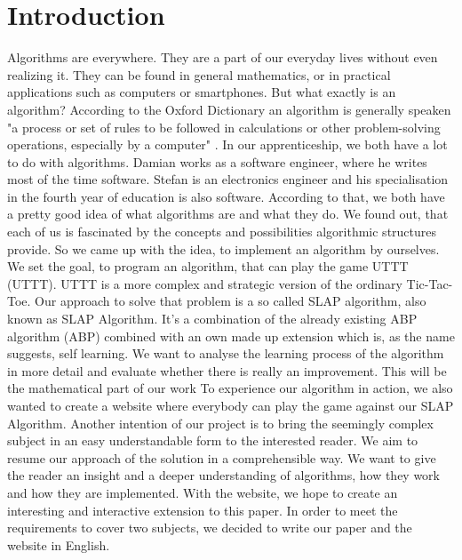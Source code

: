 \section{Introduction}
Algorithms are everywhere. They are a part of our everyday lives without even realizing it. They can be found in general mathematics, or in practical applications such as  computers or smartphones. But what exactly is an algorithm? According to the Oxford Dictionary an algorithm is generally speaken "a process or set of rules to be followed in calculations or other problem-solving operations, especially by a computer" \cite{web:oxforddictionaries2018}.
In our apprenticeship, we both have a lot to do with algorithms. Damian works as a software engineer, where he writes most of the time software. Stefan is an electronics engineer and his specialisation in the fourth year of education is also software. According to that, we both have a pretty good idea of what algorithms are and what they do. We found out, that each of us is fascinated by the concepts and possibilities algorithmic structures provide. So we came up with the idea, to implement an algorithm by ourselves. \\

We set the goal, to program an algorithm, that can play the game \acl{UTTT} (\ac{UTTT}). \ac{UTTT} is a more complex and strategic version of the ordinary Tic-Tac-Toe. 
Our approach to solve that problem is a so called \acl {SLAP}  algorithm, also known as \ac{SLAP} Algorithm. It's a combination of the already existing \acl{ABP} algorithm (\ac{ABP}) combined with an own made up extension which is, as the name suggests, self learning. We want to analyse the learning process of the algorithm in more detail and evaluate whether there is really an improvement. This will be the mathematical part of our work
To experience our algorithm in action, we also wanted to create a website where everybody can play the game against our \ac{SLAP} Algorithm.
Another intention of our project is to bring the seemingly complex subject in an easy understandable form to the interested reader. We aim to resume our approach of the solution in a comprehensible way. We want to give the reader an insight and a deeper understanding of algorithms, how they work and how they are implemented. With the website, we hope to create an interesting and interactive extension to this paper.
In order to meet the requirements to cover two subjects, we decided to write our paper and the website in English. \\

